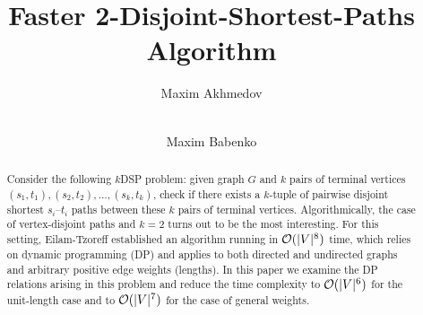 \title{Faster 2-Disjoint-Shortest-Paths Algorithm}

\author{Maxim Akhmedov \and \\
Maxim Babenko}


\maketitle

\begin{abstract}
Consider the following $k$DSP problem: given graph $G$ and $k$ pairs of terminal vertices $(s_1, t_1), (s_2, t_2), \ldots, (s_k, t_k)$, check if there exists a $k$-tuple of pairwise disjoint shortest $s_i$--$t_i$ paths between these $k$ pairs of terminal vertices. Algorithmically, the case of vertex-disjoint paths and $k=2$ turns out to be the most interesting. For this setting, Eilam-Tzoreff established an algorithm running in $\mathcal{O}(|V|^8)$ time, which relies on dynamic programming (DP) and applies to both directed and undirected graphs and arbitrary positive edge weights (lengths). In this paper we examine the DP relations arising in this problem and reduce the time complexity to $\mathcal{O}(|V|^6)$ for the unit-length case and to $\mathcal{O}(|V|^7)$ for the case of general weights.

\end{abstract}
